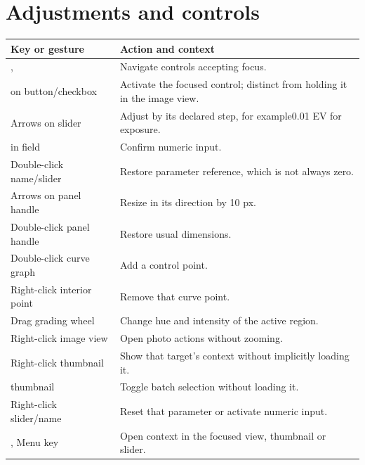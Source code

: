 \section*{Adjustments and controls}
\begin{longtable}{@{}L{4.4cm}L{9.2cm}@{}}
\toprule Key or gesture & Action and context\\\midrule\endhead
{},  & Navigate controls accepting focus.\\
 on button/checkbox & Activate the focused control; distinct from holding it in the image view.\\
Arrows on slider & Adjust by its declared step, for example0.01 EV for exposure.\\
 in field & Confirm numeric input.\\
Double-click name/slider & Restore parameter reference, which is not always zero.\\
Arrows on panel handle & Resize in its direction by 10 px.\\
Double-click panel handle & Restore usual dimensions.\\
Double-click curve graph & Add a control point.\\
Right-click interior point & Remove that curve point.\\
Drag grading wheel & Change hue and intensity of the active region.\\
Right-click image view & Open photo actions without zooming.\\
Right-click thumbnail & Show that target's context without implicitly loading it.\\
 thumbnail & Toggle batch selection without loading it.\\
Right-click slider/name & Reset that parameter or activate numeric input.\\
, Menu key & Open context in the focused view, thumbnail or slider.\\
\bottomrule
\end{longtable}

